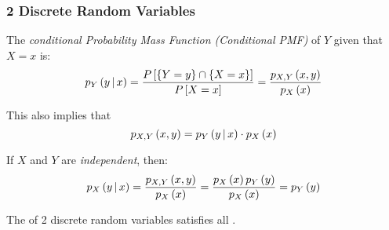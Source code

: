 			\subsubsection{2 Discrete Random Variables} \label{subsubsec:2 Discrete Random Variables}
				\begin{definition} \label{def:2 Discrete-Conditional PMF}
					The \emph{conditional Probability Mass Function (Conditional PMF)} of $Y$ given that $X=x$ is:
					\begin{equation} \label{eq:2 Discrete-Conditional PMF}
						p_{Y} \left( y \operatorname{\vert} x \right)
							= \frac{P \left[ \lbrace Y=y \rbrace \cap \lbrace X=x \rbrace \right]}{P \left[ X=x \right]} 
							= \frac{p_{X,Y} \left( x,y \right)}{p_{X} \left( x \right)}
					\end{equation}
					\begin{remark}
						This also implies that
						\begin{equation} \label{eq:2 Discrete-Joint PMF}
							p_{X,Y} \left( x,y \right) = p_{Y} \left( y \operatorname{\vert} x \right) \cdot p_{X} \left( x \right)
						\end{equation}
					\end{remark}
					\begin{remark}
						If $X$ and $Y$ are \emph{independent}, then:
						\begin{equation} \label{eq:2 Discrete-Independent Conditional PMF}
							p_{X} \left( y \operatorname{\vert} x \right)
							= \frac{p_{X,Y} \left( x,y \right)}{p_{X} \left( x \right)}
							= \frac{p_{X} \left( x \right) p_{Y} \left( y \right)}{p_{X} \left( x \right)}
							= p_{Y} \left( y \right)
						\end{equation}
					\end{remark}
					\begin{remark}
						The  of 2 discrete random variables satisfies all .
					\end{remark}
				\end{definition}

